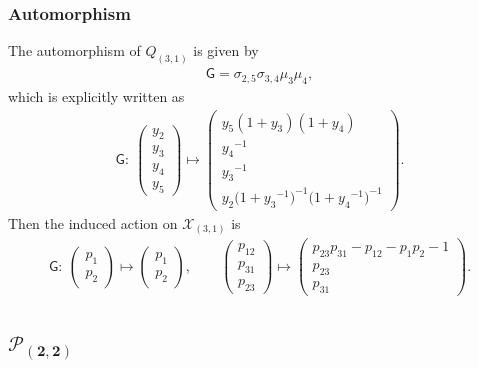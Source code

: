 \documentclass[pdftex]{sigma}
\numberwithin{equation}{section}
\begin{document}
\subsubsection*{Automorphism}
The automorphism of $Q_{(3,1)}$ is given by
\begin{gather} \label{G_31}
 \mathsf{G} = \sigma_{2,5} \sigma_{3,4} \mu_3 \mu_4 ,
\end{gather}
which is explicitly written as
\begin{gather*}
 \mathsf{G}\colon \
 \begin{pmatrix}
 y_2 \\ y_3 \\ y_4 \\ y_5
 \end{pmatrix}
 \mapsto
 \begin{pmatrix}
 y_5 ( 1+ y_3 ) ( 1+ y_4 ) \\
 {y_4}^{-1} \\
 {y_3}^{-1} \\
 y_2 \big( 1+ {y_3}^{-1} \big)^{-1} \big( 1+ {y_4}^{-1} \big)^{-1}
 \end{pmatrix} .
\end{gather*}
Then the induced action on $\mathcal{X}_{(3,1)}$ is
\begin{gather*}
 \mathsf{G}\colon \
 \begin{pmatrix}
 p_1 \\
 p_2
 \end{pmatrix}
 \mapsto
 \begin{pmatrix}
 p_1 \\
 p_2
 \end{pmatrix} , \qquad
 \begin{pmatrix}
 p_{12} \\ p_{31} \\ p_{23}
 \end{pmatrix}
 \mapsto
 \begin{pmatrix}
 p_{23} p_{31} - p_{12} - p_1 p_2 - 1 \\
 p_{23} \\
 p_{31}
 \end{pmatrix} .
\end{gather*}

\subsection[$\mathcal{P}_{(2,2)}$]{$\boldsymbol{\mathcal{P}_{(2,2)}}$}
\end{document}
